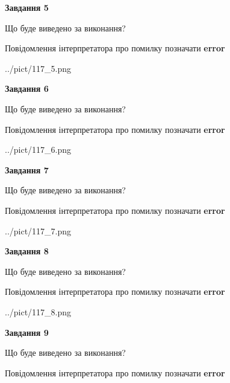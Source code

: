 \documentclass[11pt, ukrainian]{article}
\begin{document}
{\begin {large}
{\begin {center}\textbf{Завдання 5}\end {center}}\par
Що буде виведено за виконання? \par
Повідомлення інтерпретатора про помилку позначати \textbf{error}

\begin{center}
	{../pict/117_5.png}
\end{center}
\newpage

{\begin {center}\textbf{Завдання 6}\end {center}}\par
Що буде виведено за виконання? \par
Повідомлення інтерпретатора про помилку позначати \textbf{error}

\begin{center}
	{../pict/117_6.png}
\end{center}
\newpage

{\begin {center}\textbf{Завдання 7}\end {center}}\par
Що буде виведено за виконання? \par
Повідомлення інтерпретатора про помилку позначати \textbf{error}

\begin{center}
	{../pict/117_7.png}
\end{center}
\newpage

{\begin {center}\textbf{Завдання 8}\end {center}}\par
Що буде виведено за виконання? \par
Повідомлення інтерпретатора про помилку позначати \textbf{error}

\begin{center}
	{../pict/117_8.png}
\end{center}
\newpage

{\begin {center}\textbf{Завдання 9}\end {center}}\par
Що буде виведено за виконання? \par
Повідомлення інтерпретатора про помилку позначати \textbf{error}


\end{large}}
\end{document}
